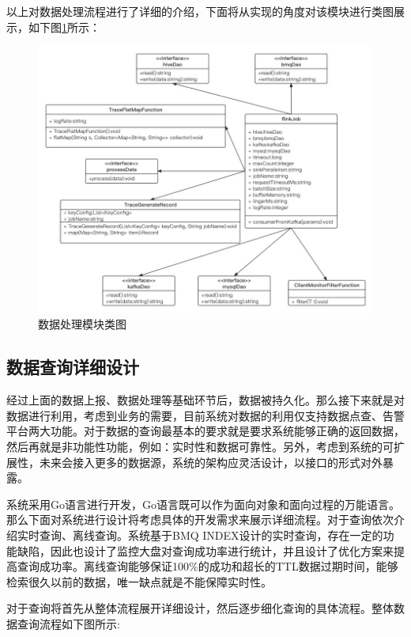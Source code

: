 以上对数据处理流程进行了详细的介绍，下面将从实现的角度对该模块进行类图展示，如下图\ref{shujuchulileitu}所示：
   \begin{figure}[htb]
  \centering
  \includegraphics[width=5in]{figure/chapter4/数据处理模块类图.jpg}
  \caption{数据处理模块类图}\label{shujuchulileitu}
\end{figure}

\subsection{数据查询详细设计}
经过上面的数据上报、数据处理等基础环节后，数据被持久化。那么接下来就是对数据进行利用，考虑到业务的需要，目前系统对数据的利用仅支持数据点查、告警平台两大功能。对于数据的查询最基本的要求就是要求系统能够正确的返回数据，然后再就是非功能性功能，例如：实时性和数据可靠性。另外，考虑到系统的可扩展性，未来会接入更多的数据源，系统的架构应灵活设计，以接口的形式对外暴露。

系统采用Go语言进行开发，Go语言既可以作为面向对象和面向过程的万能语言。那么下面对系统进行设计将考虑具体的开发需求来展示详细流程。对于查询依次介绍实时查询、离线查询。系统基于BMQ INDEX设计的实时查询，存在一定的功能缺陷，因此也设计了监控大盘对查询成功率进行统计，并且设计了优化方案来提高查询成功率。离线查询能够保证100$\%$的成功和超长的TTL数据过期时间，能够检索很久以前的数据，唯一缺点就是不能保障实时性。

对于查询将首先从整体流程展开详细设计，然后逐步细化查询的具体流程。整体数据查询流程如下图所示:

